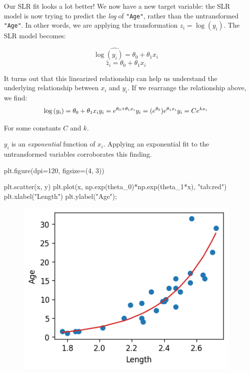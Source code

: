 \documentclass[
  letterpaper,
  DIV=11,
  numbers=noendperiod]{scrreprt}
\newenvironment{Shaded}{\begin{snugshade}}{\end{snugshade}}
\newcommand{\DecValTok}[1]{\textcolor[rgb]{0.68,0.00,0.00}{#1}}
\newcommand{\NormalTok}[1]{\textcolor[rgb]{0.00,0.23,0.31}{#1}}
\newcommand{\OperatorTok}[1]{\textcolor[rgb]{0.37,0.37,0.37}{#1}}
\newcommand{\StringTok}[1]{\textcolor[rgb]{0.13,0.47,0.30}{#1}}
\begin{document}
Our SLR fit looks a lot better! We now have a new target variable: the
SLR model is now trying to predict the \emph{log} of \texttt{"Age"},
rather than the untransformed \texttt{"Age"}. In other words, we are
applying the transformation \(z_i = \log{(y_i)}\). The SLR model
becomes:

\[\log{\hat{(y_i)}} = \theta_0 + \theta_1 x_i\]
\[\hat{z}_i = \theta_0 + \theta_1 x_i\]

It turns out that this linearized relationship can help us understand
the underlying relationship between \(x_i\) and \(y_i\). If we rearrange
the relationship above, we find: \[
\log{(y_i)} = \theta_0 + \theta_1 x_i \\
y_i = e^{\theta_0 + \theta_1 x_i} \\
y_i = (e^{\theta_0})e^{\theta_1 x_i} \\
y_i = C e^{k x_i}
\]

For some constants \(C\) and \(k\).

\(y_i\) is an \emph{exponential} function of \(x_i\). Applying an
exponential fit to the untransformed variables corroborates this
finding.

\begin{Shaded}
\begin{Highlighting}[]
\NormalTok{plt.figure(dpi}\OperatorTok{=}\DecValTok{120}\NormalTok{, figsize}\OperatorTok{=}\NormalTok{(}\DecValTok{4}\NormalTok{, }\DecValTok{3}\NormalTok{))}

\NormalTok{plt.scatter(x, y)}
\NormalTok{plt.plot(x, np.exp(theta\_0)}\OperatorTok{*}\NormalTok{np.exp(theta\_1}\OperatorTok{*}\NormalTok{x), }\StringTok{"tab:red"}\NormalTok{)}
\NormalTok{plt.xlabel(}\StringTok{"Length"}\NormalTok{)}
\NormalTok{plt.ylabel(}\StringTok{"Age"}\NormalTok{)}\OperatorTok{;}
\end{Highlighting}
\end{Shaded}

\begin{figure}[H]

{\centering \includegraphics{constant_model_loss_transformations/loss_transformations_files/figure-pdf/cell-8-output-1.png}

}

\end{figure}
\end{document}
